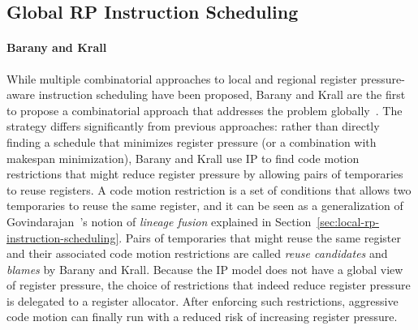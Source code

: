 \documentclass[acmsmall,authorversion,nonacm]{acmart}
\begin{document}
\subsection{Global RP Instruction Scheduling}
\label{sec:global-rp-instruction-scheduling}

\paragraph{Barany and Krall}

While multiple combinatorial approaches to local and regional register
pressure-aware instruction scheduling have been proposed, Barany and
Krall are the first to propose a combinatorial approach that addresses
the problem globally~\cite{Barany2013}.
The strategy differs significantly from previous approaches: rather
than directly finding a schedule that minimizes register pressure (or
a combination with makespan minimization), Barany and Krall use IP to
find code motion restrictions that might reduce register pressure by
allowing pairs of temporaries to reuse registers.
A code motion restriction is a set of conditions that allows two
temporaries to reuse the same register, and it can be seen as a
generalization of Govindarajan~\etal{}'s notion of \emph{lineage
  fusion} explained in
Section~\ref{sec:local-rp-instruction-scheduling}.
Pairs of temporaries that might reuse the same register and their
associated code motion restrictions are called \emph{reuse candidates}
and \emph{blames} by Barany and Krall.
Because the IP model does not have a global view of register pressure,
the choice of restrictions that indeed reduce register pressure is
delegated to a register allocator.
After enforcing such restrictions, aggressive code motion can finally
run with a reduced risk of increasing register pressure.
\end{document}
